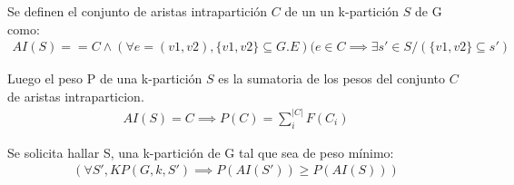 Se definen el conjunto de aristas intrapartici\'on $C$ de un un k-partici\'on $S$ de G como:
\begin{align*}
AI(S) == C \wedge
(\forall e = (v1,v2), \{v1,v2\} \subseteq G.E)(e \in C \implies \exists s' \in S /  (\{v1,v2\} \subseteq s') 
\end{align*}

Luego el peso P de una k-partici\'on $S$ es la sumatoria de los pesos del conjunto $C$ de aristas intraparticion.
\begin{align*}
AI(S) = C \implies P(C) = \sum_{i}^{|C|}F(C_{i})
\end{align*}


Se solicita hallar S, una k-partici\'on de G tal que sea de peso m\'inimo:
\begin{align*}
(\forall S', KP(G,k,S') \implies P(AI(S'))\geq P(AI(S)))
\end{align*}

\newpage



